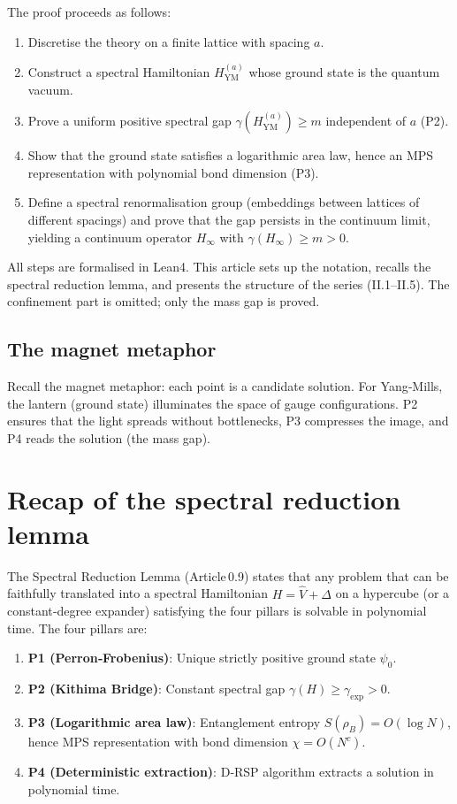 \documentclass[11pt,a4paper]{article}
\begin{document}
The proof proceeds as follows:
\begin{enumerate}
\item Discretise the theory on a finite lattice with spacing $a$.
\item Construct a spectral Hamiltonian $H_{\mathrm{YM}}^{(a)}$ whose ground state is the quantum vacuum.
\item Prove a uniform positive spectral gap $\gamma(H_{\mathrm{YM}}^{(a)}) \ge m$ independent of $a$ (P2).
\item Show that the ground state satisfies a logarithmic area law, hence an MPS representation with polynomial bond dimension (P3).
\item Define a spectral renormalisation group (embeddings between lattices of different spacings) and prove that the gap persists in the continuum limit, yielding a continuum operator $H_{\infty}$ with $\gamma(H_{\infty}) \ge m > 0$.
\end{enumerate}
All steps are formalised in Lean4. This article sets up the notation, recalls the spectral reduction lemma, and presents the structure of the series (II.1–II.5). The confinement part is omitted; only the mass gap is proved.

\subsection{The magnet metaphor}

Recall the magnet metaphor: each point is a candidate solution. For Yang‑Mills, the lantern (ground state) illuminates the space of gauge configurations. P2 ensures that the light spreads without bottlenecks, P3 compresses the image, and P4 reads the solution (the mass gap).

\section{Recap of the spectral reduction lemma}

The Spectral Reduction Lemma (Article 0.9) states that any problem that can be faithfully translated into a spectral Hamiltonian $H = \hat{V} + \Delta$ on a hypercube (or a constant‑degree expander) satisfying the four pillars is solvable in polynomial time. The four pillars are:

\begin{enumerate}
\item \textbf{P1 (Perron‑Frobenius)}: Unique strictly positive ground state $\psi_0$.
\item \textbf{P2 (Kithima Bridge)}: Constant spectral gap $\gamma(H) \ge \gamma_{\mathrm{exp}} > 0$.
\item \textbf{P3 (Logarithmic area law)}: Entanglement entropy $S(\rho_B)=O(\log N)$, hence MPS representation with bond dimension $\chi = O(N^c)$.
\item \textbf{P4 (Deterministic extraction)}: D‑RSP algorithm extracts a solution in polynomial time.
\end{enumerate}
\end{document}
